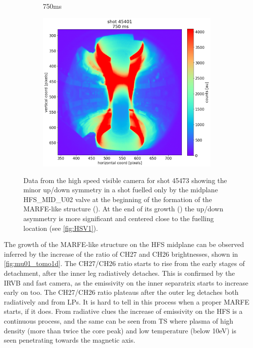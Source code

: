 \begin{figure}[!ht]
\begin{subfigure}{0.3\linewidth}
         \caption{750ms}
         \label{fig:mu01_tomo4b}
    \end{subfigure}
    \begin{subfigure}{0.054\linewidth}
         \centering
         \vspace{-6mm}
         \includegraphics[trim={595 0 0 50},clip,width=\textwidth]{Chapters/chapter2/figs/45473_for_paper_750ms.png}
    \end{subfigure}
    \caption{Data from the high speed visible camera for shot 45473 showing the minor up/down symmetry in a shot fuelled only by the midplane HFS\_MID\_U02 valve at the beginning of the formation of the MARFE-like structure (). At the end of its growth () the up/down asymmetry is more significant and centered close to the fuelling location (see \autoref{fig:HSV1}).}
    \label{fig:mu01_tomo4}
\end{figure}

The growth of the MARFE-like structure on the HFS midplane can be observed inferred by the increase of the ratio of CH27 and CH26 brightnesses, shown in \autoref{fig:mu01_tomo1d}. The CH27/CH26 ratio starts to rise from the early stages of detachment, after the inner leg radiatively detaches. This is confirmed by the IRVB and fast camera, as the emissivity on the inner separatrix starts to increase early on too. The CH27/CH26 ratio plateaus after the outer leg detaches both radiatively and from LPs. It is hard to tell in this process when a proper MARFE starts, if it does. From radiative clues the increase of emissivity on the HFS is a continuous process, and the same can be seen from TS where plasma of high density (more than twice the core peak) and low temperature (below 10eV) is seen penetrating towards the magnetic axis.

